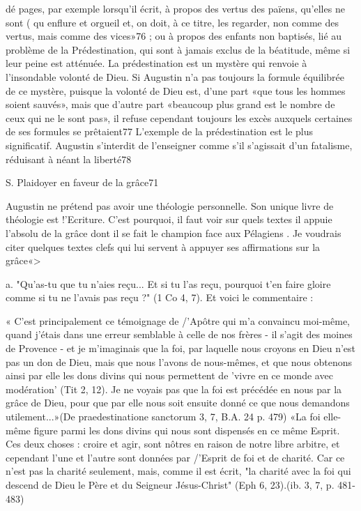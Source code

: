 dé pages, par exemple lorsqu'il écrit, à propos des vertus des païens, qu'elles ne sont	(
qu enflure et orgueil et, on doit, à ce titre, les regarder, non comme des vertus, mais
comme des vices»76 ; ou à propos des enfants non baptisés, lié au problème de la Prédestination, qui sont à jamais exclus de la béatitude, même si leur peine est
atténuée. La prédestination est un mystère qui renvoie à l'insondable volonté de Dieu. Si Augustin n'a pas toujours la formule équilibrée de ce mystère, puisque la volonté de Dieu est, d'une part «que tous les hommes soient sauvés», mais que d'autre part
«beaucoup plus grand est le nombre de ceux qui ne le sont pas», il refuse cependant toujours les excès auxquels certaines de ses formules se prêtaient77  L'exemple de la prédestination est le plus significatif. Augustin s'interdit de l'enseigner comme s'il s'agissait d'un fatalisme, réduisant à néant la liberté78 

S. Plaidoyer  en faveur de la grâce71

Augustin ne prétend pas avoir une théologie personnelle. Son unique livre de théologie est !'Ecriture. C'est pourquoi, il faut voir sur quels textes il appuie l'absolu de la grâce dont il se fait le champion face aux Pélagiens . Je voudrais citer quelques textes clefs qui lui servent à appuyer ses affirmations sur la grâce«>

a.	"Qu'as-tu que tu n'aies reçu... Et si tu l'as reçu, pourquoi t'en faire gloire comme si tu ne l'avais pas reçu ?" (1 Co 4, 7). Et voici le commentaire :

« C'est principalement ce témoignage de /'Apôtre qui m'a convaincu moi-même, quand j'étais dans une erreur semblable à celle de nos frères - il s'agit des moines de Provence - et je m'imaginais que la foi, par laquelle nous croyons en Dieu n'est pas un don de Dieu, mais que nous l'avons de nous-mêmes, et que nous obtenons ainsi par elle les dons divins qui nous permettent de 'vivre en ce monde avec modération' (Tit 2, 12). Je ne voyais pas que la foi est précédée en nous par la grâce de Dieu, pour que par elle nous soit ensuite donné ce que nous demandons utilement...»(De praedestinatione sanctorum 3, 7, B.A. 24 p. 479)
«La foi elle-même figure parmi les dons divins qui nous sont dispensés en ce même Esprit. Ces deux choses : croire et agir, sont nôtres en raison de notre libre arbitre, et cependant l'une et l'autre sont données par /'Esprit de foi et de charité. Car ce n'est pas la charité seulement, mais, comme il est écrit, "la charité avec la foi qui descend de Dieu le Père et du Seigneur Jésus-Christ" (Eph 6, 23).(ib. 3, 7, p. 481-483)





